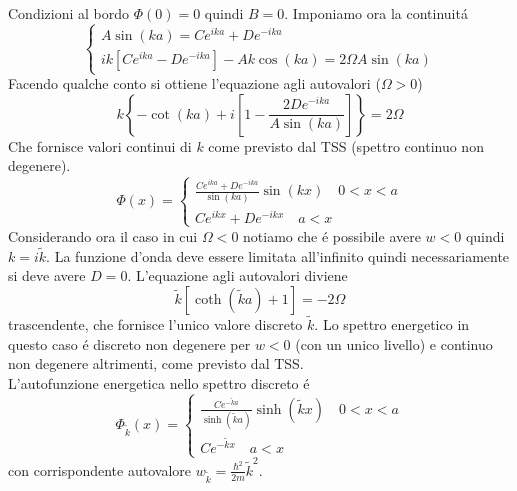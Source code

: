 \documentclass[a4paper]{article}
\begin{document}
        Condizioni al bordo $\Phi(0)=0$ quindi $B=0$.
        Imponiamo ora la continuit\'a
        \begin{equation*}
            \begin{cases}
                A\sin(ka)=Ce^{ika}+De^{-ika}\\
                ik\left[Ce^{ika}-De^{-ika}\right]-Ak\cos(ka)=2\Omega A\sin(ka)
            \end{cases}
        \end{equation*}
        Facendo qualche conto si ottiene l'equazione agli autovalori ($\Omega>0$)
        \begin{equation*}
            k\left\{-\cot(ka)+i\left[1-\frac{2De^{-ika}}{A\sin(ka)}\right]\right\}=2\Omega
        \end{equation*}
        Che fornisce valori continui di $k$ come previsto dal TSS (spettro continuo non degenere).
        \begin{equation*}
            \Phi(x)=
            \begin{cases}
                \frac{Ce^{ika}+De^{-ika}}{\sin(ka)}\sin(kx)\quad 0<x<a\\
                Ce^{ikx}+De^{-ikx}\quad a<x
            \end{cases}
        \end{equation*}
        Considerando ora il caso in cui $\Omega<0$ notiamo che \'e possibile avere $w<0$ quindi $k=i\tilde{k}$.
        La funzione d'onda deve essere limitata all'infinito quindi necessariamente si deve avere $D=0$.
        L'equazione agli autovalori diviene
        \begin{equation*}
            \tilde{k}\left[\coth(\tilde{k}a)+1\right]=-2\Omega
        \end{equation*}
        trascendente, che fornisce l'unico valore discreto $\tilde{k}$.
        Lo spettro energetico in questo caso \'e discreto non degenere per $w<0$ (con un unico livello) e continuo non degenere altrimenti, come previsto dal TSS.\\
        L'autofunzione energetica nello spettro discreto \'e
        \begin{equation*}
            \Phi_{\tilde{k}}(x)=
            \begin{cases}
                \frac{Ce^{-\tilde{k}a}}{\sinh(\tilde{k}a)}\sinh(\tilde{k}x)\quad 0<x<a\\
                Ce^{-\tilde{k}x}\quad a<x
            \end{cases}
        \end{equation*}
        con corrispondente autovalore $w_{\tilde{k}}=\frac{\hbar^2}{2m}\tilde{k}^2$.
        
\end{document}
